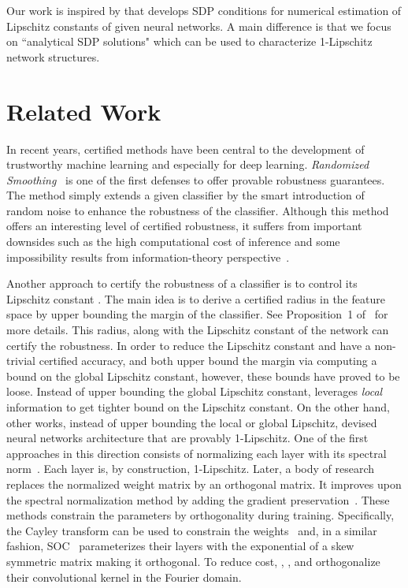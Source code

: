 \documentclass{article} \usepackage{iclr2023_conference,times}
\newcommand{\0}{\mathbf{0} }
\begin{document}
Our work is inspired by \cite{fazlyab2019efficient} that develops SDP conditions for numerical estimation of Lipschitz constants of given neural networks. A main difference is that we focus on ``analytical SDP solutions" which can be used to characterize 1-Lipschitz network structures. 


\section{Related Work}

In recent years, certified methods have been central to the development of trustworthy machine learning and especially for deep learning. 
\textit{Randomized Smoothing}~\citep{cohen2019certified,salman2019provably} is one of the first defenses to offer provable robustness guarantees. The method simply extends a given classifier by the smart introduction of  random noise to enhance the robustness of the classifier.
Although this method offers an interesting level of certified robustness, it suffers from important downsides such as the high computational cost of inference and some impossibility results from information-theory perspective~\citep{yang2020randomized,kumar2020curse}.

Another approach to certify the robustness of a classifier is to control its Lipschitz constant \citep{hein2017formal,tsuzuku2018lipschitz}. The main idea is to derive a certified radius in the feature space by upper bounding the margin of the classifier. See Proposition~1 of~\cite{tsuzuku2018lipschitz} for more details. This radius, along with the Lipschitz constant of the network can certify the robustness. 
In order to reduce the Lipschitz constant and have a non-trivial certified accuracy, \cite{tsuzuku2018lipschitz} and \cite{leino2021globally} both upper bound the margin via computing a bound on the global Lipschitz constant, however, these bounds have proved to be loose.
Instead of upper bounding the global Lipschitz constant, \cite{huang2021training} leverages {\em local} information to get tighter bound on the Lipschitz constant.  
On the other hand, other works, instead of upper bounding the local or global Lipschitz, devised neural networks architecture that are provably 1-Lipschitz. 
One of the first approaches in this direction consists of  normalizing each layer with its spectral norm~\citep{miyato2018spectral,farnia2018generalizable}. Each layer is, by construction,  1-Lipschitz.
Later, a body of research replaces the normalized weight matrix by an orthogonal matrix. It improves  upon the spectral normalization method by  adding  the gradient preservation~\citep{li2019preventing,trockman2021orthogonalizing,skew2021sahil,yu2022constructing,xulot2022}.
These methods constrain the parameters by orthogonality during training.
Specifically, the Cayley transform can be used to constrain the weights~\citep{trockman2021orthogonalizing} and,  
in a similar fashion, SOC~\citep{skew2021sahil}  parameterizes their layers with the exponential of a skew symmetric matrix making it orthogonal.
To reduce cost, \cite{trockman2021orthogonalizing}, \cite{yu2022constructing}, and \cite{xulot2022} orthogonalize their convolutional kernel in the Fourier domain.
\end{document}
